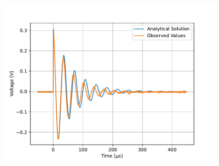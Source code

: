 \documentclass[11pt]{texMemo-gibbons}
\begin{document}
\begin{figure}[h!]
  \centering
  \includegraphics[width=0.7\linewidth]{plots/plot.pdf}
  \caption{}
  \label{fig:plot}
\end{figure}
\end{document}
